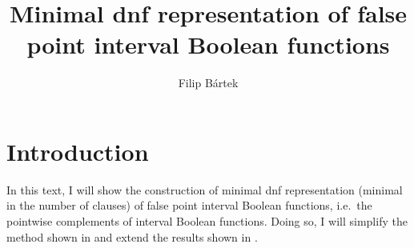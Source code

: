 \documentclass{article}
\author{Filip Bártek}
\title{Minimal \acrshort{dnf} representation of false point interval Boolean functions}
\begin{document}
\maketitle

\section{Introduction}
In this text,
I will show the construction of minimal \acrshort{dnf} representation
(minimal in the number of clauses)
of false point interval Boolean functions,
i.e.~the pointwise complements of interval Boolean functions.
Doing so, I will simplify the method shown in \cite{Dubovsky2012}
and extend the results shown in \cite{Schieber2005154}.



\printglossaries
\end{document}

